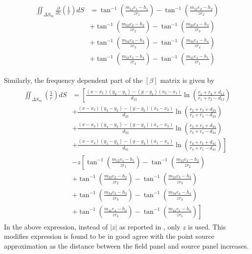 \begin{align}
    \begin{split}
        \label{eq:partial_r_z}
        \iint_{\Delta S_m} \frac{\partial}{\partial z}\left(\frac{1}{r}\right) dS 
        &=\tan ^{-1}\left(\frac{m_{12} e_{1}-h_{1}}{z r_{1}}\right)-\tan ^{-1}\left(\frac{m_{12} e_{2}-h_{2}}{z r_{2}}\right) \\
        &+\tan ^{-1}\left(\frac{m_{23} e_{2}-h_{2}}{z r_{2}}\right)-\tan ^{-1}\left(\frac{m_{23} e_{3}-h_{3}}{z r_{3}}\right) \\
        &+\tan ^{-1}\left(\frac{m_{34} e_{3}-h_{3}}{z r_{3}}\right)-\tan ^{-1}\left(\frac{m_{34} e_{4}-h_{4}}{z r_{4}}\right) \\
        &+\tan ^{-1}\left(\frac{m_{41} e_{4}-h_{4}}{z r_{4}}\right)-\tan ^{-1}\left(\frac{m_{41} e_{4}-h_{1}}{z r_{1}}\right)
    \end{split}
\end{align}

Similarly, the frequency dependent part of the $[\beta]$ matrix is given by
\begin{align}
    \begin{split}
        \label{eq:frq_indi_beta}
       \iint_{\Delta S_m}{\left(\frac{1}{r}\right)} dS &= \left[\frac{(x-x_1)(y_2-y_1) - (y-y_1)(x_2-x_1)}{d_{12}}\ln\left(\frac{r_1+r_2+d_{12}}{r_1+r_2-d_{12}}\right)\right. \\
&+ \left.\frac{(x-x_2)(y_3-y_2)-(y-y_2)(x_3-x_2)}{d_{23}}\ln\left(\frac{r_2+r_3+d_{23}}{r_2+r_3-d_{23}}\right)\right. \\
&+ \left.\frac{(x-x_3)(y_4-y_3) -(y-y_4)(x_4-x_3)}{d_{34}}\ln\left(\frac{r_3+r_4+d_{34}}{r_3+r_4-d_{34}}\right)\right. \\
&+ \left.\frac{(x-x_4)(y_1-y_4) -(y-y_4)(x_1-x_4)}{d_{41}}\ln\left(\frac{r_4+r_1+d_{41}}{r_4+r_1-d_{41}}\right)\right] \\
&- z\left[\tan^{-1}\left(\frac{m_{12}e_1-h_1}{zr_1}\right)-\tan^{-1}\left(\frac{m_{12}e_2-h_2}{zr_2}\right)\right. \\
&+ \left.\tan^{-1}\left(\frac{m_{23}e_2-h_2}{zr_2}\right)-\tan^{-1}\left(\frac{m_{23}e_3-h_3}{zr_3}\right)\right.\\
&+ \left.\tan^{-1}\left(\frac{m_{34}e_3-h_3}{zr_3}\right)-\tan^{-1}\left(\frac{m_{34}e_4-h_4}{zr_4}\right)\right.\\
&+ \left.\tan^{-1}\left(\frac{m_{41}e_4-h_4}{zr_4}\right)-\tan^{-1}\left(\frac{m_{41}e_1-h_1}{zr_1}\right)\right] 
    \end{split}
\end{align}
In the above expression, instead of $|z|$ as reported in \cite{katz2001low}, only $z$ is used. This modifies expression is found 
to be in good agree with the point source approximation as the distance between the field panel and source panel increases.

